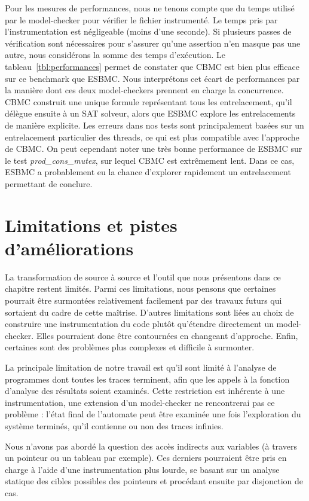 Pour les mesures de performances, nous ne tenons compte que du temps utilisé par
le model-checker pour vérifier le fichier instrumenté. Le temps pris par
l'instrumentation est négligeable (moins d'une seconde). Si plusieurs passes de
vérification sont nécessaires pour s'assurer qu'une assertion n'en masque pas
une autre, nous considérons la somme des temps d'exécution. Le
tableau~\ref{tbl:performances} permet de constater que CBMC est bien plus
efficace sur ce benchmark que ESBMC. Nous interprétons cet écart de performances
par la manière dont ces deux model-checkers prennent en charge la concurrence.
CBMC construit une unique formule représentant tous les entrelacement, qu'il
délègue ensuite à un SAT solveur, alors que ESBMC explore les entrelacements de
manière explicite. Les erreurs dans nos tests sont principalement basées sur un
entrelacement particulier des threads, ce qui est plus compatible avec
l'approche de CBMC. On peut cependant noter une très bonne performance de ESBMC
sur le test \emph{prod\_cons\_mutex}, sur lequel CBMC est extrêmement lent. Dans
ce cas, ESBMC a probablement eu la chance d'explorer rapidement un entrelacement
permettant de conclure.

\section{Limitations et pistes d'améliorations}

La transformation de source à source et l'outil que nous présentons dans ce
chapitre restent limités. Parmi ces limitations, nous pensons que certaines
pourrait être surmontées relativement facilement par des travaux futurs qui
sortaient du cadre de cette maîtrise. D'autres limitations sont liées au choix
de construire une instrumentation du code plutôt qu'étendre directement un
model-checker. Elles pourraient donc être contournées en changeant d'approche.
Enfin, certaines sont des problèmes plus complexes et difficile à surmonter.

La principale limitation de notre travail est qu'il sont limité à l'analyse de
programmes dont toutes les traces terminent, afin que les appels à la fonction
d'analyse des résultats soient examinés. Cette restriction est inhérente à une
instrumentation, une extension d'un model-checker ne rencontrerai pas ce
problème : l'état final de l'automate peut être examinée une fois l'exploration
du système terminés, qu'il contienne ou non des traces infinies.

Nous n'avons pas abordé la question des accès indirects aux variables (à travers
un pointeur ou un tableau par exemple). Ces derniers pourraient être pris en
charge à l'aide d'une instrumentation plus lourde, se basant sur un analyse
statique des cibles possibles des pointeurs et procédant ensuite par disjonction
de cas.

